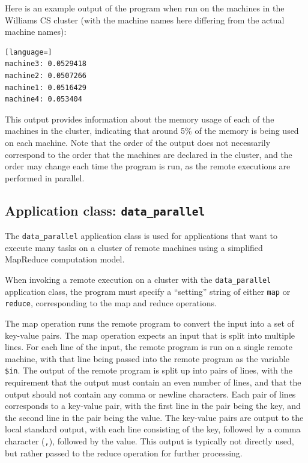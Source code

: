 \documentclass[twoside]{report}
\begin{document}
Here is an example output of the program when run on the machines in the Williams CS cluster (with the machine names here differing from the actual machine names):

\begin{minipage}[c]{\textwidth-15pt}
  \begin{lstlisting}[language=]
machine3: 0.0529418
machine2: 0.0507266
machine1: 0.0516429
machine4: 0.053404
\end{lstlisting}
  \smallskip
\end{minipage}

This output provides information about the memory usage of each of the machines in the cluster, indicating that around 5\% of the memory is being used on each machine.
Note that the order of the output does not necessarily correspond to the order that the machines are declared in the cluster, and the order may change each time the program is run, as the remote executions are performed in parallel.

\subsection{Application class: \texttt{data\_parallel}}

The \texttt{data\_parallel} application class is used for applications that want to execute many tasks on a cluster of remote machines using a simplified MapReduce computation model.

When invoking a remote execution on a cluster with the \texttt{data\_parallel} application class, the program must specify a ``setting'' string of either \texttt{map} or \texttt{reduce}, corresponding to the map and reduce operations.

The map operation runs the remote program to convert the input into a set of key-value pairs.
The map operation expects an input that is split into multiple lines.
For each line of the input, the remote program is run on a single remote machine, with that line being passed into the remote program as the variable \texttt{\$in}.
The output of the remote program is split up into pairs of lines, with the requirement that the output must contain an even number of lines, and that the output should not contain any comma or newline characters.
Each pair of lines corresponds to a key-value pair, with the first line in the pair being the key, and the second line in the pair being the value.
The key-value pairs are output to the local standard output, with each line consisting of the key, followed by a comma character (\texttt{,}), followed by the value.
This output is typically not directly used, but rather passed to the reduce operation for further processing.
\end{document}

